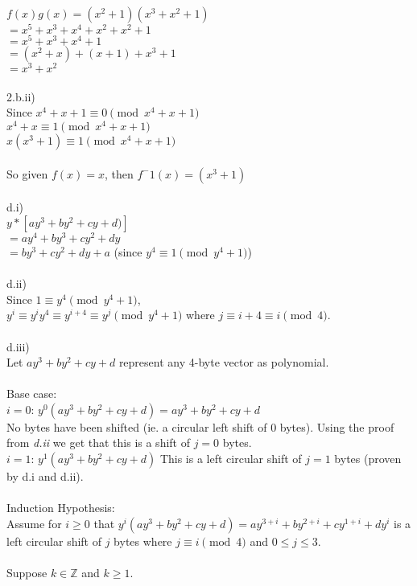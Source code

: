 \documentclass{assignment}
\newcommand\tab[1][0.5cm]{\hspace*{#1}}
\begin{document}
\begin{problemlist}
\begin{problem}
\begin{answer}
$f(x)g(x)=(x^2+1)(x^3+x^2+1)$\\
$=x^5+x^3+x^4+x^2+x^2+1$\\
$=x^5+x^3+x^4+1$\\
$=(x^2+x)+(x+1)+x^3+1$\\
$=x^3+x^2$\\
\\
2.b.ii)\\
Since $x^4+x+1\equiv 0  \pmod{x^4+x+1}$\\
$x^4+x\equiv 1  \pmod{x^4+x+1}$\\
$x(x^3+1)\equiv 1  \pmod{x^4+x+1}$\\
\\
So given $f(x)=x$, then $f^-1(x)=(x^3+1)$\\
\\
d.i)\\
$y*[ay^3+by^2+cy+d)]$\\
$=ay^4+by^3+cy^2+dy$\\
$=by^3+cy^2+dy+a$ \tab (since $y^4\equiv 1 \pmod {y^4+1}$)\\
\\
d.ii)\\
Since $1\equiv y^4 \pmod {y^4+1}$,\\
$y^i\equiv y^iy^4\equiv y^{i+4}\equiv y^j \pmod {y^4+1}$ where $j\equiv i+4\equiv i \pmod 4$.\\
\\
d.iii)\\
Let $ay^3+by^2+cy+d$ represent any 4-byte vector as polynomial.\\
\\
Base case:\\
$i=0$: $y^0(ay^3+by^2+cy+d)=ay^3+by^2+cy+d$ \\
\tab No bytes have been shifted (ie. a circular left shift of 0 bytes). Using the proof from \emph{d.ii} we get that this is a shift of $j=0$ bytes. \\
$i=1$: $y^1(ay^3+by^2+cy+d)$  This is a left circular shift of $j=1$ bytes (proven by d.i and d.ii).\\
\\
Induction Hypothesis:\\
Assume for $i\geq 0$ that $y^i(ay^3+by^2+cy+d)=ay^{3+i}+by^{2+i}+cy^{1+i}+dy^i$ is a left circular shift of $j$ bytes where $j\equiv i \pmod 4$ and $0\leq j\leq 3$.\\
\\
Suppose $k \in \mathbb{Z}$ and $k \geq 1$.\\

\end{answer}
\end{problem}
\end{problemlist}
\end{document}
